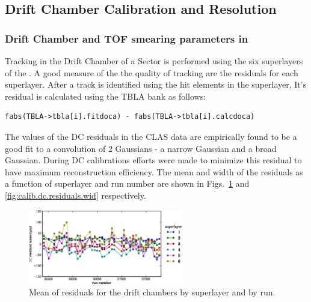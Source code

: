 \subsection{\label{sec:calib.dc}Drift Chamber Calibration and Resolution}

\subsubsection{\label{sec:DC.TOF.res}Drift Chamber and TOF smearing parameters in }

Tracking in the Drift Chamber of a  Sector is performed using the six superlayers of the . A good measure of the the quality of tracking are the  residuals for each superlayer. After a track is identified using the hit elements in the  superlayer, It's  residual is calculated using the TBLA bank as follows:

\begin{verbatim}
fabs(TBLA->tbla[i].fitdoca) - fabs(TBLA->tbla[i].calcdoca)
\end{verbatim}

The values of the DC residuals in the CLAS data are empirically found to be a good fit to a convolution of 2 Gaussians - a narrow Gaussian and a broad Gaussian. During DC calibrations efforts were made to minimize this residual to have maximum reconstruction efficiency. The mean and width of the residuals as a function of superlayer and run number are shown in Figs.~\ref{fig:calib.dc.residuals.mean} and \ref{fig:calib.dc.residuals.wid} respectively.


\begin{figure}\begin{center}
\includegraphics[width=0.6\textwidth]{figures/calib/dc/dc_resid_mean.eps}
\caption[DC Residuals (Mean)]{\label{fig:calib.dc.residuals.mean}Mean of residuals for the drift chambers by superlayer and by run.}
\end{center}\end{figure}

